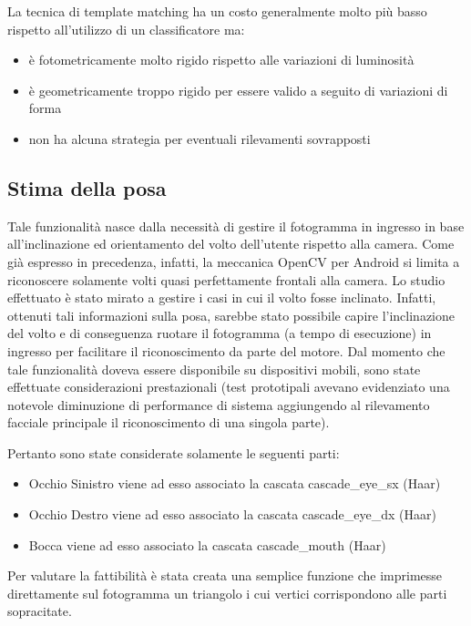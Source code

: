 	La tecnica di template matching ha un costo generalmente molto più basso rispetto all'utilizzo di un classificatore ma:
	
	\begin{itemize}
	\item è fotometricamente molto rigido rispetto alle variazioni di luminosità
	\item è geometricamente troppo rigido per essere valido a seguito di variazioni di forma
	\item non ha alcuna strategia per eventuali rilevamenti sovrapposti
	\end{itemize}

\newpage
\subsection{Stima della posa}

Tale funzionalità nasce dalla necessità di gestire il fotogramma in ingresso in base all'inclinazione ed orientamento del volto dell'utente rispetto alla camera. Come già espresso in precedenza, infatti, la meccanica OpenCV per Android si limita a riconoscere solamente volti quasi perfettamente frontali alla camera. Lo studio effettuato è stato mirato a gestire i casi in cui il volto fosse inclinato. Infatti, ottenuti tali informazioni sulla posa, sarebbe stato possibile capire l'inclinazione del volto e di conseguenza ruotare il fotogramma (a tempo di esecuzione) in ingresso per facilitare il riconoscimento da parte del motore. Dal momento che tale funzionalità doveva essere disponibile su dispositivi mobili, sono state effettuate considerazioni prestazionali (test prototipali avevano evidenziato una notevole diminuzione di performance di sistema aggiungendo al rilevamento facciale principale il riconoscimento di una singola parte). 

Pertanto sono state considerate solamente le seguenti parti:

\begin{itemize}
\item Occhio Sinistro viene ad esso associato la cascata cascade\_eye\_sx (Haar)
\item Occhio Destro viene ad esso associato la cascata cascade\_eye\_dx (Haar)
\item Bocca viene ad esso associato la cascata cascade\_mouth (Haar)
\end{itemize}

Per valutare la fattibilità è stata creata una semplice funzione che imprimesse direttamente sul fotogramma un triangolo i cui vertici corrispondono alle parti sopracitate.

